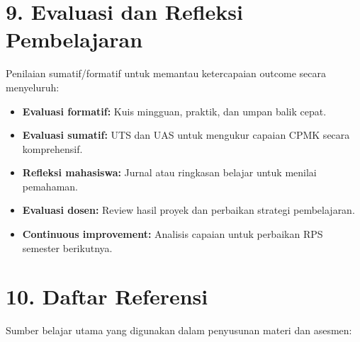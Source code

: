 \documentclass[12pt,a4paper]{article}
\begin{document}
\vspace{0.5cm}

\section*{9. Evaluasi dan Refleksi Pembelajaran}

Penilaian sumatif/formatif untuk memantau ketercapaian outcome secara menyeluruh:

\begin{itemize}[leftmargin=*]
  \item \textbf{Evaluasi formatif:} Kuis mingguan, praktik, dan umpan balik cepat.
  \item \textbf{Evaluasi sumatif:} UTS dan UAS untuk mengukur capaian CPMK secara komprehensif.
  \item \textbf{Refleksi mahasiswa:} Jurnal atau ringkasan belajar untuk menilai pemahaman.
  \item \textbf{Evaluasi dosen:} Review hasil proyek dan perbaikan strategi pembelajaran.
  \item \textbf{Continuous improvement:} Analisis capaian untuk perbaikan RPS semester berikutnya.
\end{itemize}

\vspace{0.5cm}

\section*{10. Daftar Referensi}

Sumber belajar utama yang digunakan dalam penyusunan materi dan asesmen:
\end{document}
